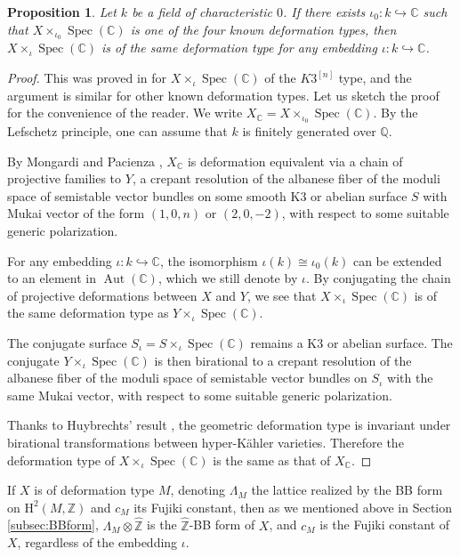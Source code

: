 \documentclass[11pt,reqno,oneside]{amsart}
\numberwithin{equation}{section}
\newtheorem{proposition}[theorem]{Proposition}
\theoremstyle{definition}
\DeclareMathOperator{\Aut}{Aut}
\DeclareMathOperator{\Spec}{Spec}
\newcommand\rH{\mathrm{H}}
\newcommand{\CC}{\mathbb{C}}
\newcommand{\ZZ}{\mathbb{Z}}
\begin{document}
\begin{proposition}
Let $k$ be a  field of characteristic $0$. If there exists $\iota_0:k\hookrightarrow \CC$ such that $X\times_{\iota_0} \Spec (\CC)$ is one of the four known deformation types, then $X\times_{\iota}\Spec(\CC)$ is of the same deformation type for any embedding $\iota:k\hookrightarrow \CC$.
\end{proposition}
\begin{proof}
This was proved in \cite[Proposition 2.3.1]{Yang2019} for $X\times_{\iota}\Spec(\CC)$ of the $K3^{[n]}$ type, and the argument is similar for other known deformation types. Let us sketch the proof for the convenience of the reader. We write $X_\CC=X\times_{\iota_0} \Spec(\CC)$. By the Lefschetz principle, one can assume that $k$ is finitely generated over $\mathbb{Q}$.

    By Mongardi and Pacienza \cite[Corollary 1.2 \& Example 3.18]{MongardiPacienza}, $X_\CC$ is deformation equivalent via a chain of projective families to $Y$, a crepant resolution of the albanese fiber of the moduli space of semistable vector bundles on some smooth K3 or abelian surface $S$ with Mukai vector of the form $(1, 0, n)$ or $(2,0,-2)$, with respect to some suitable generic polarization.
  
   For any embedding $\iota: k\hookrightarrow \CC$, the isomorphism $\iota(k)\cong \iota_0(k)$ can be extended to an element in $\Aut(\CC)$, which we still denote by $\iota$. By conjugating the chain of projective deformations between $X$ and $Y$, we see that $X\times_\iota \Spec(\CC)$ is of the same deformation type as $Y\times_\iota \Spec(\CC)$.
   
   The conjugate surface $S_{\iota}=S\times_\iota \Spec(\CC)$ remains a K3 or abelian surface. The conjugate $Y\times_\iota \Spec(\CC)$ is then birational to a crepant resolution of the albanese fiber of the moduli space of semistable vector bundles on $S_{\iota}$ with the same Mukai vector, with respect to some suitable generic polarization. 

 Thanks to Huybrechts' result \cite[Theorem 4.6]{MR1664696},  the geometric deformation type is invariant under birational transformations between hyper-Kähler varieties. Therefore the deformation type of $X\times_\iota \Spec(\CC)$ is the same as that of $X_\CC$. 
\end{proof}



If $X$ is of deformation type $M$, denoting  $\Lambda_M$  the lattice realized by the BB form on $\rH^2(M,\ZZ)$  and $c_M$ its Fujiki constant, then as we mentioned above in Section \ref{subsec:BBform}, $\Lambda_M\otimes \widehat{\ZZ}$ is the $\widehat{\ZZ}$-BB form of $X$, and $c_M$ is the Fujiki constant of $X$, regardless of the embedding $\iota$. 
\end{document}
